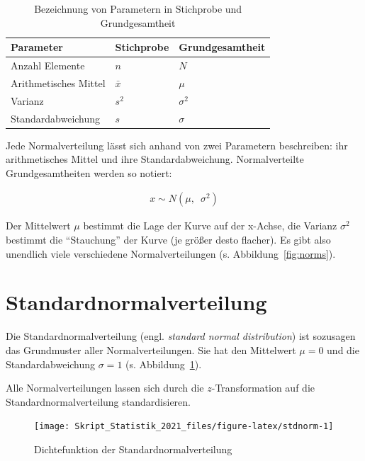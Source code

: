 \documentclass[
  11pt,
  ngerman,
  a4paper,
]{report}
\begin{document}
\begin{table}

\caption{\label{tab:param}Bezeichnung von Parametern in Stichprobe und Grundgesamtheit}
\centering
\begin{tabular}[t]{lll}
\toprule
Parameter & Stichprobe & Grundgesamtheit\\
\midrule
Anzahl Elemente & $n$ & $N$\\
Arithmetisches Mittel & $\bar{x}$ & $\mu$\\
Varianz & $s^2$ & $\sigma^2$\\
Standardabweichung & $s$ & $\sigma$\\
\bottomrule
\end{tabular}
\end{table}

Jede Normalverteilung lässt sich anhand von zwei Parametern beschreiben: ihr arithmetisches Mittel und ihre Standardabweichung. Normalverteilte Grundgesamtheiten werden so notiert:

\nopagebreak

\[\begin{aligned}
x \sim N(\mu,\enspace\sigma^2)
\end{aligned}
\label{eq:norm}\]

Der Mittelwert \(\mu\) bestimmt die Lage der Kurve auf der x-Achse, die Varianz \(\sigma^2\) bestimmt die \enquote{Stauchung} der Kurve (je größer desto flacher). Es gibt also unendlich viele verschiedene Normalverteilungen (s. Abbildung~\ref{fig:norms}).

\hypertarget{standardnormalverteilung}{%
\section{Standardnormalverteilung}\label{standardnormalverteilung}}

Die Standardnormalverteilung (engl. \emph{standard normal distribution}) ist sozusagen das Grundmuster aller Normalverteilungen. Sie hat den Mittelwert \(\mu=0\) und die Standardabweichung \(\sigma=1\) (s. Abbildung~\ref{fig:stdnorm}).

Alle Normalverteilungen lassen sich durch die \(z\)-Transformation auf die Standardnormalverteilung standardisieren.

\begin{figure}[!h]

{\centering \texttt{[image: Skript\_Statistik\_2021\_files/figure-latex/stdnorm-1]} 

}

\caption{Dichtefunktion der Standardnormalverteilung}\label{fig:stdnorm}
\end{figure}
\end{document}
